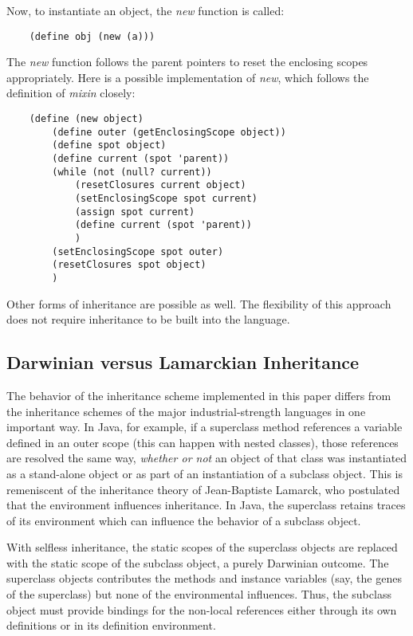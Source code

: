 Now, to instantiate an object, the {\it new} function is called:

\begin{verbatim}
    (define obj (new (a)))
\end{verbatim}

The {\it new} function follows the parent pointers to reset the enclosing
scopes appropriately. Here is a possible implementation of {\it new},
which follows the definition of {\it mixin} closely:

\begin{verbatim}
    (define (new object)
        (define outer (getEnclosingScope object))
        (define spot object)
        (define current (spot 'parent))
        (while (not (null? current))
            (resetClosures current object)
            (setEnclosingScope spot current)
            (assign spot current)
            (define current (spot 'parent))
            )
        (setEnclosingScope spot outer)
        (resetClosures spot object)
        )
\end{verbatim}

Other forms of inheritance are possible as well. The flexibility of this
approach does not require inheritance to be built into the language.

\subsection{Darwinian versus Lamarckian Inheritance}

The behavior of the inheritance scheme implemented in this paper differs
from the inheritance schemes of the major industrial-strength languages
in one important way.  In Java, for example, if a superclass method
references a variable defined in an outer scope (this can happen
with nested classes), those references are resolved the same way,
{\it whether or not} an object of that class was instantiated as a
stand-alone object or as part of an instantiation of a subclass object.
This is remeniscent of the inheritance theory of Jean-Baptiste Lamarck,
who postulated that the environment influences inheritance. In Java,
the superclass retains traces of its environment which can influence
the behavior of a subclass object.

With selfless inheritance, the static scopes of the superclass objects
are replaced with the static scope of the subclass object, a purely
Darwinian outcome. The superclass objects contributes the methods
and instance variables (say, the genes of the superclass) but none of
the environmental influences.  Thus, the subclass object must provide
bindings for the non-local references either through its own definitions
or in its definition environment.

